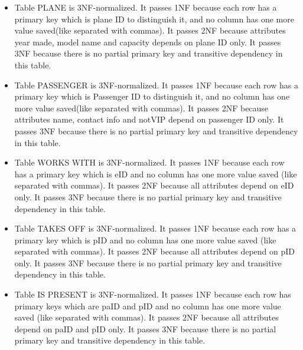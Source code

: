 \documentclass[10pt,conference]{IEEEtran}
\begin{document}
\begin{itemize} \item{Table PLANE is 3NF-normalized. It passes 1NF because each row has a primary key which is plane ID to distinguish it, and no column has one more value saved(like separated with commas). It passes 2NF because attributes year made, model name and capacity depends on plane ID only. It passes 3NF because there is no partial primary key and transitive dependency in this table.
} \end{itemize}

\begin{itemize} \item{Table PASSENGER is 3NF-normalized. It passes 1NF because each row has a primary key which is Passenger ID to distinguish it, and no column has one more value saved(like separated with commas). It passes 2NF because attributes name, contact info and notVIP depend on passenger ID only. It passes 3NF because there is no partial primary key and transitive dependency in this table.
} \end{itemize}

\begin{itemize} \item{Table WORKS WITH is 3NF-normalized. It passes 1NF because each row has a primary key which is eID and no column has one more value saved (like separated with commas). It passes 2NF because all attributes depend on eID only. It passes 3NF because there is no partial primary key and transitive dependency in this table.
} \end{itemize} 

\begin{itemize} \item{Table TAKES OFF is 3NF-normalized. It passes 1NF because each row has a primary key which is pID and no column has one more value saved (like separated with commas). It passes 2NF because all attributes depend on pID only. It passes 3NF because there is no partial primary key and transitive dependency in this table.
} \end{itemize}

\begin{itemize} \item{Table IS PRESENT is 3NF-normalized. It passes 1NF because each row has primary keys which are paID and pID and no column has one more value saved (like separated with commas). It passes 2NF because all attributes depend on paID and pID only. It passes 3NF because there is no partial primary key and transitive dependency in this table.
} \end{itemize}
\end{document}
